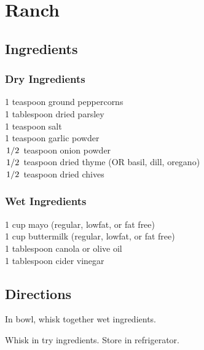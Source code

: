 \documentclass{article}
\newcounter{qcounter}
\begin{document}
\newcommand{\slfrac}[2]{\left.#1\middle/#2\right.}
\newcommand{\degree}{\ensuremath{^\circ}}

\section*{Ranch}



\subsection*{Ingredients}
\subsubsection*{Dry Ingredients}
1 teaspoon ground peppercorns\\
1 tablespoon dried parsley\\
1 teaspoon salt\\
1 teaspoon garlic powder\\
$\slfrac{1}{2}$ teaspoon onion powder\\
$\slfrac{1}{2}$ teaspoon dried thyme (OR basil, dill, oregano)\\
$\slfrac{1}{2}$ teaspoon dried chives\\

\subsubsection*{Wet Ingredients}
1 cup mayo (regular, lowfat, or fat free)\\
1 cup buttermilk (regular, lowfat, or fat free)\\
1 tablespoon canola or olive oil\\
1 tablespoon cider vinegar\\


\subsection*{Directions}
\begin{list}{:~}{}
\item In bowl, whisk together wet ingredients.
\item Whisk in try ingredients.  Store in refrigerator.
\end{list}
\end{document}
